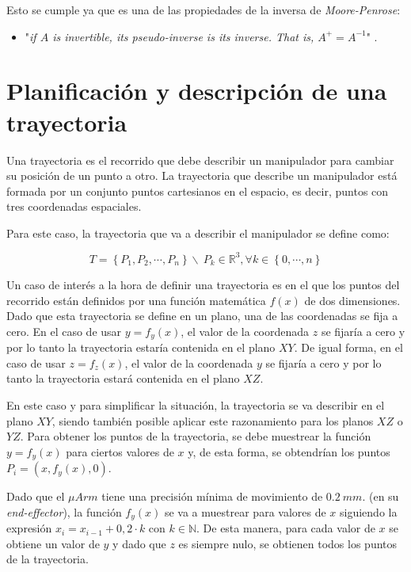 \documentclass[a4paper,12pt]{article}
\newcommand*{\field}[1]{\mathbb{#1}}%
\begin{document}
Esto se cumple ya que es una de las propiedades de la inversa de \textit{Moore-Penrose}:

\begin{itemize}
    \item "\textit{if $A$ is invertible, its pseudo-inverse is its inverse. That is,
              $A^+ = A^{-1}$}" \cite{noauthor_moorepenrose_2019}.
\end{itemize}

\section{Planificación y descripción de una trayectoria}
\label{sec:trajectory}

Una trayectoria es el recorrido que debe describir un manipulador para cambiar su posición de un punto a otro.
La trayectoria que describe un manipulador está formada por un conjunto puntos cartesianos en el espacio,
es decir, puntos con tres coordenadas espaciales.

Para este caso, la trayectoria que va a describir el manipulador se define como:

\begin{equation}
    T = \left\{P_1, P_2, \cdots, P_{n}\right\} \backslash ~ P_k \in \field{R}^3, \forall k \in \left\{0, \cdots, n\right\}
\end{equation}

Un caso de interés a la hora de definir una trayectoria es en el que los puntos del recorrido
están definidos por una función matemática $f(x)$ de dos dimensiones. Dado que esta trayectoria
se define en un plano, una de las coordenadas se fija a cero. En el caso de usar $y = f_y(x)$,
el valor de la coordenada $z$ se fijaría a cero y por lo tanto la trayectoria estaría contenida
en el plano $XY$. De igual forma, en el caso de usar $z = f_z(x)$, el valor de la coordenada $y$
se fijaría a cero y por lo tanto la trayectoria estará contenida en el plano $XZ$.

En este caso y para simplificar la situación, la trayectoria se va describir en el plano $XY$,
siendo también posible aplicar este razonamiento para los planos $XZ$ o $YZ$. Para obtener
los puntos de la trayectoria, se debe muestrear la función $y = f_y(x)$ para ciertos valores de $x$
y, de esta forma, se obtendrían los puntos $P_{i} = \left(x, f_y(x), 0\right)$.

Dado que el $\mu Arm$ tiene una precisión mínima de movimiento de $0.2~mm.$ (en su \textit{end-effector}),
la función $f_y(x)$ se va a muestrear para valores de $x$ siguiendo la expresión
$x_{i} = x_{i-1} + 0,2 \cdot k$ con $k \in \field{N}$.
De esta manera, para cada valor de $x$ se obtiene un valor de $y$ y dado que $z$ es siempre nulo,
se obtienen todos los puntos de la trayectoria.
\end{document}
